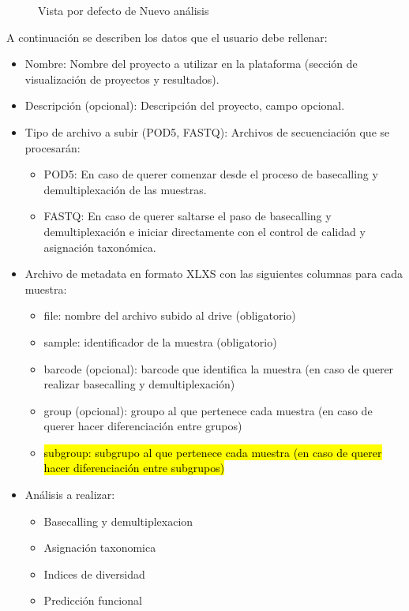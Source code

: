 \begin{itemize}
\begin{figure}[H]
    \caption{Vista por defecto de Nuevo análisis}
    \label{fig:app-new-analysis-def}
\end{figure}


A continuación se describen los datos que el usuario debe rellenar:

\begin{itemize}
    \item Nombre: Nombre del proyecto a utilizar en la plataforma (sección de visualización de proyectos y resultados).
    \item Descripción (opcional): Descripción del proyecto, campo opcional.
    \item Tipo de archivo a subir (POD5, FASTQ): Archivos de secuenciación que se procesarán:
    \begin{itemize}
        \item POD5: En caso de querer comenzar desde el proceso de basecalling y demultiplexación de las muestras.
        \item FASTQ: En caso de querer saltarse el paso de basecalling y demultiplexación e iniciar directamente con el control de calidad y asignación taxonómica.
    \end{itemize}
    \item Archivo de metadata en formato XLXS con las siguientes columnas para cada muestra:
    \begin{itemize}
        \item file: nombre del archivo subido al drive (obligatorio)
        \item sample: identificador de la muestra (obligatorio)
        \item barcode (opcional): barcode que identifica la muestra (en caso de querer realizar basecalling y demultiplexación)
        \item group (opcional): groupo al que pertenece cada muestra (en caso de querer hacer diferenciación entre grupos)
        \item \hl{subgroup: subgrupo al que pertenece cada muestra (en caso de querer hacer diferenciación entre subgrupos)}
    \end{itemize}
    \item Análisis a realizar:
    \begin{itemize}
        \item Basecalling y demultiplexacion
        \item Asignación taxonomica
        \item Indices de diversidad
        \item Predicción funcional
    \end{itemize}
\end{itemize}



\end{itemize}
